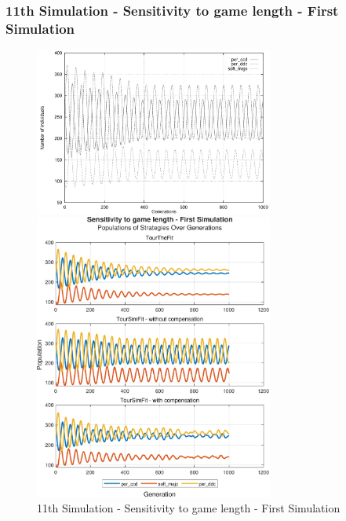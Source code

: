 \documentclass[12pt]{article}
\begin{document}
\subsubsection{11th Simulation - Sensitivity to game length - First Simulation}
	\begin{figure}[h]
	    \centering
		\includegraphics[width=0.7\textwidth]{RefPaperFigures/fig9a.jpeg}\par\vspace{0.5em}
	    \includegraphics[width=0.7\textwidth]{Sensitivity to game length - First Simulation.pdf}
	    \caption{11th Simulation - Sensitivity to game length - First Simulation}
	    \label{fig:Monotonous Convergence}
	\end{figure}
\end{document}
